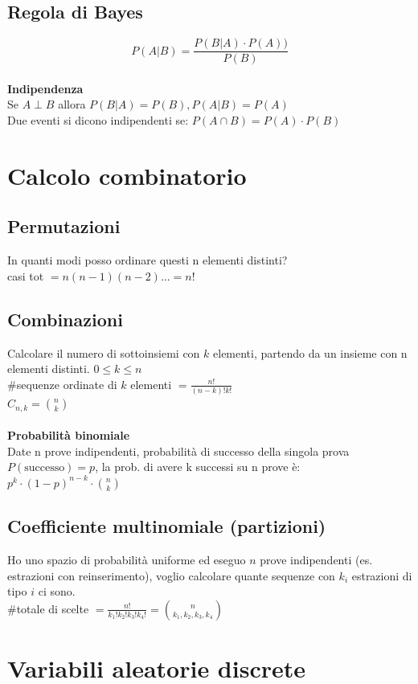 \documentclass{article}
\begin{document}
\begin{multicols*}{3}
		\subsection{Regola di Bayes}
		\[P(A|B)= \frac{P(B|A)\cdot P(A))}{P(B)}\]\\
		\textbf{Indipendenza}\\
		Se \(A \perp B\) allora \(P(B|A) = P(B) , P(A|B)= P(A)\)\\
		Due eventi si dicono indipendenti se: \(P(A\cap B)= P(A)\cdot P(B)\)
		\section{Calcolo combinatorio}
		\subsection{Permutazioni}
		In quanti modi posso ordinare questi n elementi distinti?\\
		casi tot \(=  n(n-1)(n-2)...=n!\)
		\subsection{Combinazioni}
		Calcolare il numero di sottoinsiemi con \(k\) elementi, partendo da un insieme con n elementi distinti. \(0\leq k \leq n\)\\
		\#sequenze ordinate di \(k\) elementi \(= \frac{n!}{(n-k)!k!}\)\\
		\(C_{n,k}= \binom{n}{k}\)\\\\
		\textbf{Probabilità binomiale}\\
		Date n prove indipendenti, probabilità di successo della singola prova \(P(\text{successo})= p\), la prob. di avere k successi su n prove è: \(p^k \cdot (1-p)^{n-k} \cdot \binom{n}{k}\)
		\subsection{Coefficiente multinomiale (partizioni)}
		Ho uno spazio di probabilità uniforme ed eseguo \(n\) prove indipendenti (es. estrazioni con reinserimento), voglio calcolare quante sequenze con \(k_i\) estrazioni di tipo \(i\) ci sono.\\
		\#totale di scelte \(= \frac{n!}{k_1!k_2!k_3!k_4!} = \binom{n}{k_1,k_2,k_3,k_4}\)
		
		\section{Variabili aleatorie discrete}
		

\end{multicols*}
\end{document}
